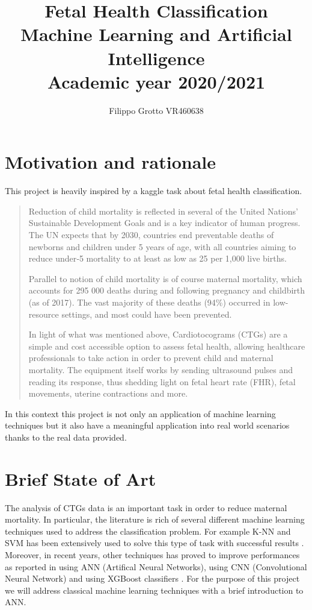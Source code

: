 \documentclass[a4paper,12pt]{article}
\begin{document}
\author{Filippo Grotto VR460638}

\title{Fetal Health Classification  \\[1ex] \large Machine Learning and Artificial Intelligence \\[1ex] \large Academic year 2020/2021}

\maketitle
\newpage
\tableofcontents
\newpage

\section{Motivation and rationale}
This project is heavily inspired by a kaggle task \cite{kaggle} about fetal health classification.
\begin{quote}
Reduction of child mortality is reflected in several of the United Nations' Sustainable Development Goals and is a key indicator of human progress.
The UN expects that by 2030, countries end preventable deaths of newborns and children under 5 years of age, with all countries aiming to reduce under‑5 mortality to at least as low as 25 per 1,000 live births.

Parallel to notion of child mortality is of course maternal mortality, which accounts for 295 000 deaths during and following pregnancy and childbirth (as of 2017). The vast majority of these deaths (94\%) occurred in low-resource settings, and most could have been prevented.

In light of what was mentioned above, Cardiotocograms (CTGs) are a simple and cost accessible option to assess fetal health, allowing healthcare professionals to take action in order to prevent child and maternal mortality. The equipment itself works by sending ultrasound pulses and reading its response, thus shedding light on fetal heart rate (FHR), fetal movements, uterine contractions and more.
\end{quote}
In this context this project is not only an application of machine learning techniques but it also have a meaningful application into real world scenarios thanks to the real data provided.

\section{Brief State of Art}
The analysis of CTGs data is an important task in order to reduce maternal mortality. In particular, the literature is rich of several different machine learning techniques used to address the classification problem. For example K-NN and SVM has been extensively used to solve this type of task with successful results \cite{ml}. Moreover, in recent years, other techniques has proved to improve performances as reported in \cite{ann} using ANN (Artifical Neural Networks), using CNN (Convolutional Neural Network) \cite{cnn} and using XGBoost classifiers \cite{ml}. For the purpose of this project we will address classical machine learning techniques with a brief introduction to ANN. 
\end{document}
